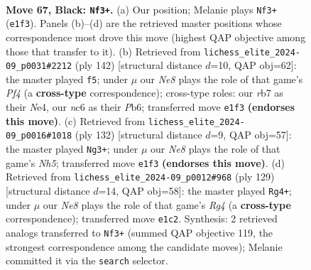 \documentclass[11pt]{article}
\begin{document}
\clearpage

\begin{figure}[p]\centering
\begin{subfigure}{0.46\textwidth}\centering
\resizebox{\linewidth}{!}{%
\newchessgame
\chessboard[
  setfen={8/1R6/2Np4/8/5k2/7p/6pK/4n3 b - - 1 67},
  showmover=false,
  pgfstyle=straightmove, color=movearrow, markmove={e1-f3}
]}
\caption{}
\end{subfigure}\hfill
\begin{subfigure}{0.46\textwidth}\centering
\resizebox{\linewidth}{!}{%
\newchessgame
\chessboard[
  setfen={8/4n1kP/1P4P1/8/4NPK1/8/8/8 w - - 1 72},
  showmover=false,
  pgfstyle=straightmove, color=movearrow, markmove={f4-f5}
]}
\caption{}
\end{subfigure}
\\[4pt]
\begin{subfigure}{0.46\textwidth}\centering
\resizebox{\linewidth}{!}{%
\newchessgame
\chessboard[
  setfen={r7/8/8/4Pk1N/5P2/5K2/8/8 w - - 7 67},
  showmover=false,
  pgfstyle=straightmove, color=movearrow, markmove={h5-g3}
]}
\caption{}
\end{subfigure}\hfill
\begin{subfigure}{0.46\textwidth}\centering
\resizebox{\linewidth}{!}{%
\newchessgame
\chessboard[
  setfen={R7/8/8/4p1r1/3pK3/8/4k3/8 b - - 15 65},
  showmover=false,
  pgfstyle=straightmove, color=movearrow, markmove={g5-g4}
]}
\caption{}
\end{subfigure}
\caption{\textbf{Move 67, Black: \texttt{Nf3+}.} (a) Our position; Melanie plays \texttt{Nf3+} (\texttt{e1f3}). Panels (b)--(d) are the retrieved master positions whose correspondence most drove this move (highest QAP objective among those that transfer to it). (b) Retrieved from \texttt{lichess\_elite\_2024-09\_p0031\#2212} (ply 142) [structural distance $d$=10, QAP obj=62]: the master played \texttt{f5}; under $\mu$ our \emph{Ne8} plays the role of that game's \emph{Pf4} (a \textbf{cross-type} correspondence); cross-type roles: our \emph{r}b7 as their \emph{N}e4, our \emph{n}c6 as their \emph{P}b6; transferred move \texttt{e1f3} \textbf{(endorses this move)}. (c) Retrieved from \texttt{lichess\_elite\_2024-09\_p0016\#1018} (ply 132) [structural distance $d$=9, QAP obj=57]: the master played \texttt{Ng3+}; under $\mu$ our \emph{Ne8} plays the role of that game's \emph{Nh5}; transferred move \texttt{e1f3} \textbf{(endorses this move)}. (d) Retrieved from \texttt{lichess\_elite\_2024-09\_p0012\#968} (ply 129) [structural distance $d$=14, QAP obj=58]: the master played \texttt{Rg4+}; under $\mu$ our \emph{Ne8} plays the role of that game's \emph{Rg4} (a \textbf{cross-type} correspondence); transferred move \texttt{e1c2}. Synthesis: 2 retrieved analogs transferred to \texttt{Nf3+} (summed QAP objective 119, the strongest correspondence among the candidate moves); Melanie committed it via the \texttt{search} selector.}
\label{fig:thought-m133}
\end{figure}
\end{document}
